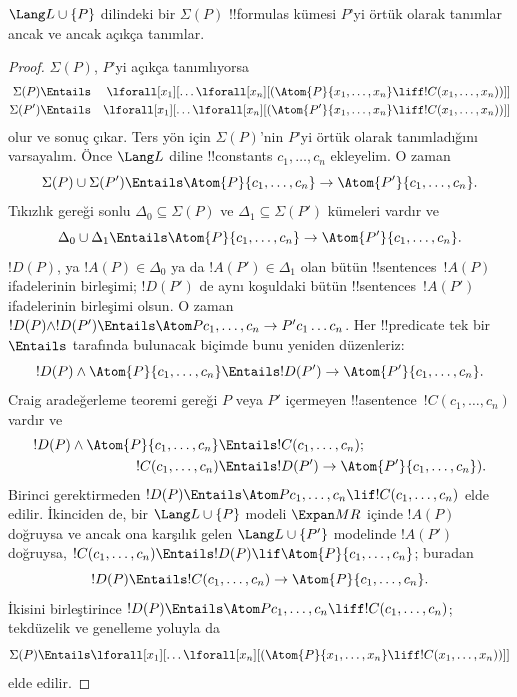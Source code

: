 \begin{thm}
$\Lang L\cup\{P\}$ dilindeki bir $\Sigma(P)$ !!{formula}s kümesi
$P$'yi örtük olarak tanımlar ancak ve ancak açıkça tanımlar.
\end{thm}

\begin{proof}
$\Sigma(P)$, $P$'yi açıkça tanımlıyorsa
\begin{align*}
  \Sigma(P) & \Entails & \lforall[x_1][\dots \lforall[x_n]
    [(\Atom{P}{x_1,\dots, x_n} \liff !C(x_1,\dots,x_n))]]\\
  \Sigma(P') & \Entails & \lforall[x_1][\dots \lforall[x_n]
    [(\Atom{P'}{x_1,\dots, x_n} \liff !C(x_1,\dots,x_n))]]
\end{align*}
olur ve sonuç çıkar. Ters yön için $\Sigma(P)$'nin $P$'yi örtük olarak
tanımladığını varsayalım. Önce $\Lang L$ diline !!{constant}s
$c_1,\dots,c_n$ ekleyelim. O zaman
\[
\Sigma(P) \cup \Sigma(P') \Entails
\Atom{P}{c_1, \dots, c_n} \to \Atom{P'}{c_1, \dots, c_n}.
\]
Tıkızlık gereği sonlu $\Delta_0\subseteq\Sigma(P)$ ve
$\Delta_1\subseteq\Sigma(P')$ kümeleri vardır ve
\[
\Delta_0 \cup \Delta_1 \Entails
\Atom{P}{c_1, \dots, c_n} \to \Atom{P'}{c_1, \dots, c_n}.
\]
$!D(P)$, ya $!A(P)\in\Delta_0$ ya da $!A(P')\in\Delta_1$ olan bütün
!!{sentence}s~$!A(P)$ ifadelerinin birleşimi; $!D(P')$ de aynı
koşuldaki bütün !!{sentence}s~$!A(P')$ ifadelerinin birleşimi olsun.
O zaman
$!D(P)\land !D(P')\Entails
\Atom P{c_1,\dots,c_n}\to P'c_1\dots c_n$. Her !!{predicate}
tek bir $\Entails$ tarafında bulunacak biçimde bunu yeniden düzenleriz:
\[
!D(P) \land \Atom{P}{c_1, \dots, c_n} \Entails
!D(P') \to \Atom{P'}{c_1, \dots, c_n}.
\]
Craig aradeğerleme teoremi gereği $P$ veya $P'$ içermeyen
!!a{sentence}~$!C(c_1,\dots,c_n)$ vardır ve
\begin{align*}
  !D(P) \land \Atom{P}{c_1, \dots, c_n}
    & \Entails !C(c_1,\dots, c_n); \\
  !C(c_1,\dots, c_n)
    & \Entails !D(P') \to \Atom{P'}{c_1, \dots, c_n}).
\end{align*}
Birinci gerektirmeden
$!D(P)\Entails\Atom P{c_1,\dots,c_n}\lif !C(c_1,\dots,c_n)$ elde
edilir. İkinciden de, bir $\Lang L\cup\{P\}$ modeli
$\Expan M R$ içinde $!A(P)$ doğruysa ve ancak ona karşılık gelen
$\Lang L\cup\{P'\}$ modelinde $!A(P')$ doğruysa,
$!C(c_1,\dots,c_n)\Entails
!D(P)\lif\Atom{P}{c_1,\dots,c_n}$; buradan
\[
!D(P) \Entails !C(c_1,\dots,c_n) \to \Atom{P}{c_1,\dots, c_n}.
\]
İkisini birleştirince
$!D(P)\Entails\Atom P{c_1,\dots,c_n}\liff !C(c_1,\dots,c_n)$; tekdüzelik
ve genelleme yoluyla da
\[
\Sigma(P) \Entails
\lforall[x_1][\dots\lforall[x_n][(\Atom{P}{x_1,\dots, x_n} \liff
    !C(x_1,\dots, x_n))]]
\]
elde edilir.
\end{proof}

